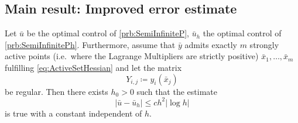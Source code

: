 \documentclass[../skript.tex]{subfiles}
\begin{document}
\subsection*{Main result: Improved error estimate}
\begin{theorem}
Let $\bar{u}$ be the optimal control of \cref{prb:SemiInfiniteP}, $\bar{u}_h$ the optimal control of \cref{prb:SemiInfinitePh}.
Furthermore, assume that $\bar{y}$ admits exactly $m$ strongly active points (i.e.\ where the Lagrange Multipliers are strictly positive) $\bar{x}_1, \ldots, \bar{x}_m$ fulfilling \cref{eq:ActiveSetHessian} and let the matrix
\[
	Y_{i,j} \coloneqq y_i(\bar{x}_j)
\]
be regular.
Then there exists $h_0 > 0$ such that the estimate
\[
	| \bar{u} - \bar{u}_h | \leq ch^2 | \log h |
\]
is true with a constant independent of $h$.
\end{theorem}
\end{document}
